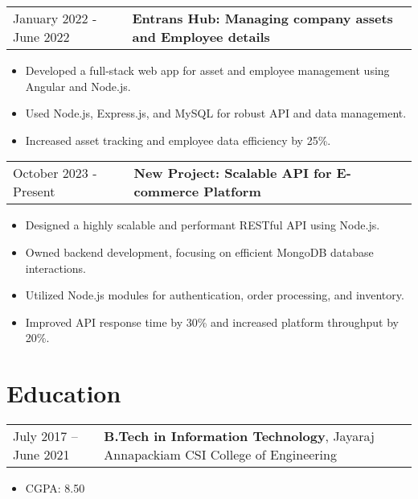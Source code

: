 \documentclass{article}
\newenvironment{onecolentry}{\begin{itemize}[leftmargin=*,noitemsep,topsep=0pt,parsep=0pt,partopsep=0pt]}{\end{itemize}}
\newenvironment{twocolentry}[1]{\begin{tabularx}{\textwidth}{lX}#1 & }{\end{tabularx}\vspace{0.1cm}}
\newenvironment{highlights}{\begin{itemize}[leftmargin=*,noitemsep,topsep=0pt,parsep=0pt,partopsep=0pt,label=\textbullet]}{\end{itemize}}
\begin{document}
\begin{twocolentry}{January 2022 - June 2022}
    \textbf{Entrans Hub: Managing company assets and Employee details}
\end{twocolentry}
\begin{onecolentry}
    \begin{highlights}
        \item Developed a full-stack web app for asset and employee management using Angular and Node.js.
        \item Used Node.js, Express.js, and MySQL for robust API and data management.
        \item Increased asset tracking and employee data efficiency by 25\%.
    \end{highlights}
\end{onecolentry}

\begin{twocolentry}{October 2023 - Present}
    \textbf{New Project: Scalable API for E-commerce Platform}
\end{twocolentry}
\begin{onecolentry}
    \begin{highlights}
        \item Designed a highly scalable and performant RESTful API using Node.js.
        \item Owned backend development, focusing on efficient MongoDB database interactions.
        \item Utilized Node.js modules for authentication, order processing, and inventory.
        \item Improved API response time by 30\% and increased platform throughput by 20\%.
    \end{highlights}
\end{onecolentry}

\section{Education}
\begin{twocolentry}{July 2017 – June 2021}
    \textbf{B.Tech in Information Technology}, Jayaraj Annapackiam CSI College of Engineering
\end{twocolentry}
\begin{onecolentry}
    \begin{highlights}
        \item CGPA: 8.50
    \end{highlights}
\end{onecolentry}
\end{document}
